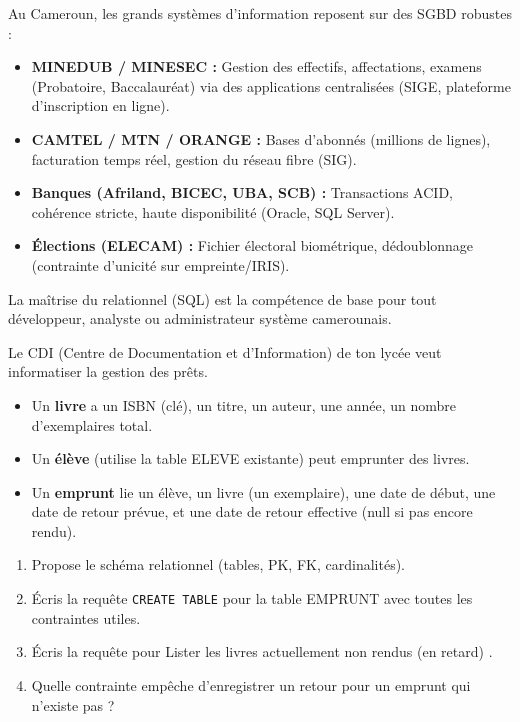 \documentclass[11pt]{article}
\begin{document}
\begin{savaistu}
Au Cameroun, les grands systèmes d'information reposent sur des SGBD robustes :
\begin{itemize}
\item \textbf{MINEDUB / MINESEC :} Gestion des effectifs, affectations, examens (Probatoire, Baccalauréat) via des applications centralisées (SIGE, plateforme d'inscription en ligne).
\item \textbf{CAMTEL / MTN / ORANGE :} Bases d'abonnés (millions de lignes), facturation temps réel, gestion du réseau fibre (SIG).
\item \textbf{Banques (Afriland, BICEC, UBA, SCB) :} Transactions ACID, cohérence stricte, haute disponibilité (Oracle, SQL Server).
\item \textbf{Élections (ELECAM) :} Fichier électoral biométrique, dédoublonnage (contrainte d'unicité sur empreinte/IRIS).
\end{itemize}
La maîtrise du relationnel (SQL) est la compétence de base pour tout développeur, analyste ou administrateur système camerounais.
\end{savaistu}

\begin{exercice}
Le CDI (Centre de Documentation et d'Information) de ton lycée veut informatiser la gestion des prêts.
\begin{itemize}
\item Un \textbf{livre} a un ISBN (clé), un titre, un auteur, une année, un nombre d'exemplaires total.
\item Un \textbf{élève} (utilise la table ELEVE existante) peut emprunter des livres.
\item Un \textbf{emprunt} lie un élève, un livre (un exemplaire), une date de début, une date de retour prévue, et une date de retour effective (null si pas encore rendu).
\end{itemize}
\begin{enumerate}
\item Propose le schéma relationnel (tables, PK, FK, cardinalités).
\item Écris la requête \texttt{CREATE TABLE} pour la table EMPRUNT avec toutes les contraintes utiles.
\item Écris la requête pour \og Lister les livres actuellement non rendus (en retard) \fg.
\item Quelle contrainte empêche d'enregistrer un retour pour un emprunt qui n'existe pas ?
\end{enumerate}
\end{exercice}
\end{document}
